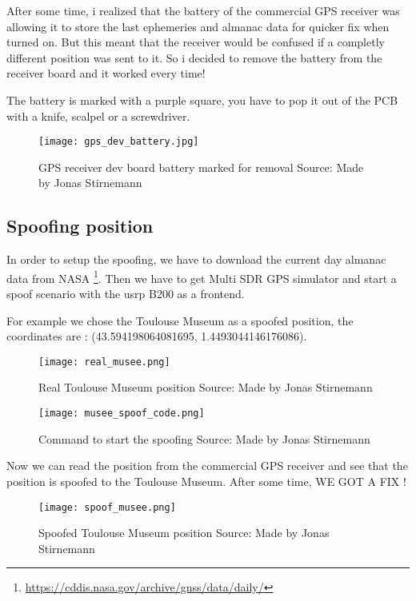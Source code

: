 After some time, i realized that the battery of the commercial GPS receiver was allowing it to store the last ephemeries and almanac data for quicker fix when turned on. But this meant that the receiver would be confused if a completly different position was sent to it. So i decided to remove the battery from the receiver board and it worked every time!

The battery is marked with a purple square, you have to pop it out of the PCB with a knife, scalpel or a screwdriver.

\begin{figure}[H]
	\centering
	\texttt{[image: gps\_dev\_battery.jpg]}
	\caption[GPS receiver dev board battery]{GPS receiver dev board battery marked for removal Source: Made by Jonas Stirnemann}
	\label{fig:battery}
\end{figure}

\subsection{Spoofing position}

In order to setup the spoofing, we have to download the current day almanac data from NASA \footnote{\url{https://cddis.nasa.gov/archive/gnss/data/daily/}}. Then we have to get Multi SDR GPS simulator and start a spoof scenario with the usrp B200 as a frontend.

For example we chose the Toulouse Museum as a spoofed position, the coordinates are : (43.594198064081695, 1.4493044146176086).

\begin{figure}[H]
	\centering
	\texttt{[image: real\_musee.png]}
	\caption[Real Toulouse Museum position]{Real Toulouse Museum position Source: Made by Jonas Stirnemann}
	\label{fig:toulouse_real}
\end{figure}

\begin{figure}[H]
	\centering
	\texttt{[image: musee\_spoof\_code.png]}
	\caption[Command to start the spoofing]{Command to start the spoofing Source: Made by Jonas Stirnemann}
	\label{fig:code_start_spoofing}
\end{figure}


Now we can read the position from the commercial GPS receiver and see that the position is spoofed to the Toulouse Museum. After some time, WE GOT A FIX !

\begin{figure}[H]
	\centering
	\texttt{[image: spoof\_musee.png]}
	\caption[Spoofed Toulouse Museum position]{Spoofed Toulouse Museum position Source: Made by Jonas Stirnemann}
	\label{fig:toulouse_spoofed}
\end{figure}


